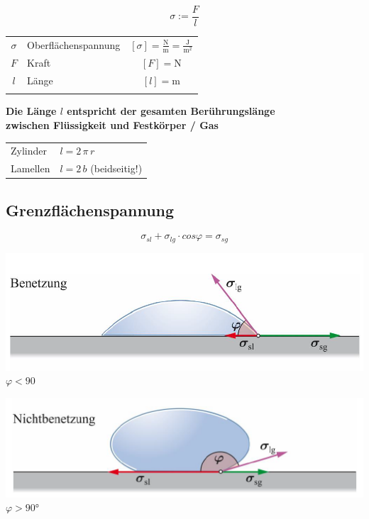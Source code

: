 $$ \boxed{ \sigma := \frac{F}{l} } $$ 


	\begin{tabular}{c l c}
		\rule{0pt}{10pt}$\sigma$ & Oberflächenspannung & $[\sigma] = \mathrm{\frac{N}{m}} = \mathrm{\frac{J}{m^2}}$ \\
		$F$ & Kraft & $[F] = \mathrm{N} $ \\
		$l$ & Länge & $[l] = \mathrm{m}$  \\
		\\
	\end{tabular}
	
	\textbf{Die Länge $l$ entspricht der gesamten Berührungslänge  \\
	zwischen Flüssigkeit und Festkörper / Gas} \\
	
	\begin{tabular}{ll}
	Zylinder & $l = 2 \, \pi \, r$ \\
	Lamellen & $l = 2 \, b$  (beidseitig!) \\
	\end{tabular}


\subsection{Grenzflächenspannung}

$$ \boxed{ \sigma_{sl} + \sigma_{lg} \cdot cos \varphi = \sigma_{sg }} $$

\begin{minipage}{0.48\linewidth}
	\includegraphics[width=\linewidth]{Bilder/benetzung.png} \\
	$ \varphi < 90 $ %
\end{minipage}
\hfill
\begin{minipage}{0.48\linewidth}
	\includegraphics[width=\linewidth]{Bilder/nichtbenetzung.png} \\
	$ \varphi > 90° $
\end{minipage}





